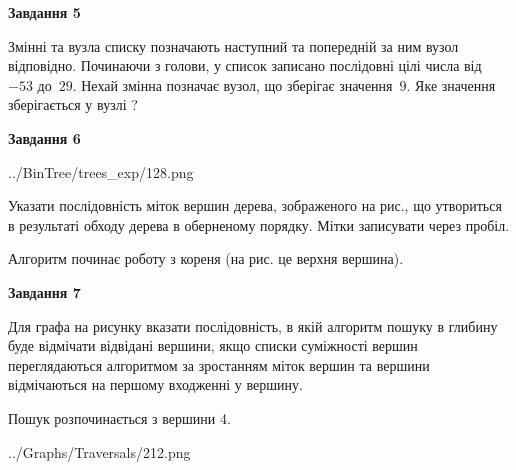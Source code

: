 \documentclass[12pt, ukrainian]{article}
\begin{document}
{\begin {large}
{\begin {center}\textbf{Завдання 5}\end {center}}\par
Змінні  та  вузла списку позначають наступний та попередній за ним вузол відповідно. Починаючи з голови, у список записано послідовні цілі числа від~$-53$ до~$29$. Нехай змінна  позначає вузол, що зберігає значення~$9$.
Яке значення зберігається у вузлі  ?\par
\newpage

{\begin {center}\textbf{Завдання 6}\end {center}}\par

\begin{center}
	{../BinTree/trees_exp/128.png}
\end{center}
Указати послідовність міток вершин дерева, зображеного на рис., що утвориться в результаті обходу дерева в оберненому порядку. Мітки записувати через пробіл.\par Алгоритм починає роботу з кореня (на рис. це верхня вершина).\par
\newpage

{\begin {center}\textbf{Завдання 7}\end {center}}\par
Для графа на рисунку вказати послідовність, в якій алгоритм пошуку в глибину буде відмічати відвідані вершини, якщо списки суміжності вершин переглядаються алгоритмом за зростанням міток вершин та вершини відмічаються на першому вход\-женні у вершину.\par
Пошук розпочинається з вершини 4.\par

\begin{center}
	{../Graphs/Traversals/212.png}
\end{center}\par
\newpage


\end{large}}
\end{document}
